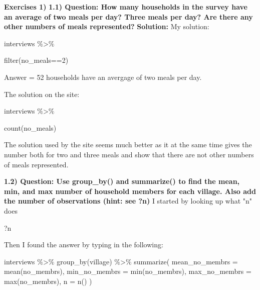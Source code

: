 \documentclass{article}
\begin{document}
\textbf{Exercises 1)} \newline
\textbf{1.1) Question: How many households in the survey have an average of two meals per day? Three meals per day? Are there any other numbers of meals represented?} \newline
\textbf{Solution:}
My solution: 
\begin{center}
    interviews $\%$\textgreater$\%$
\end{center}
\begin{center}
filter(no\_meals==2)    
\end{center}
Answer = 52 households have an avergage of two meals per day.\newline 

The solution on the site:
\begin{center}
    interviews $\%$\textgreater$\%$
\end{center}
\begin{center}
     count(no\_meals)
\end{center}
 
The solution used by the site seems much better as it at the same time gives the number both for two and three meals and show that there are not other numbers of meals represented.

\textbf{1.2) Question: Use group\_by() and summarize() to find the mean, min, and max number of household members for each village. Also add the number of observations (hint: see ?n)}\newline
I started by looking up what "n" does
\begin{center}
    ?n
\end{center}
Then I found the answer by typing in the following:
\begin{center}
    interviews $\%$\textgreater$\%$\newline
    group\_by(village) $\%$\textgreater$\%$\newline
  summarize(\newline
    mean\_no\_membrs = mean(no\_membrs),\newline
    min\_no\_membrs = min(no\_membrs),\newline
    max\_no\_membrs = max(no\_membrs),\newline
    n = n()\newline
  )
\end{center}
\end{document}

